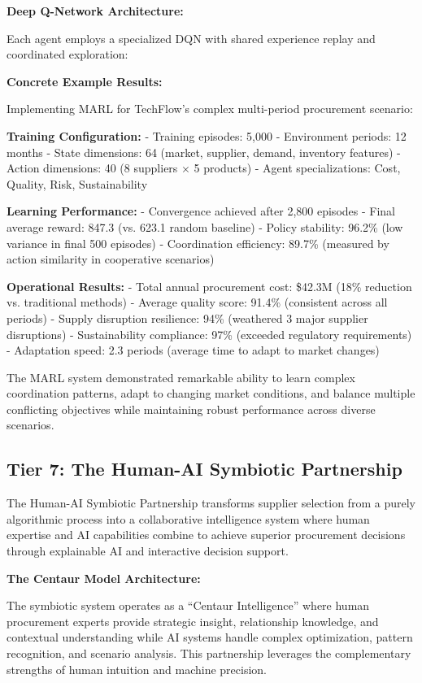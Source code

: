 \documentclass{article}
\begin{document}
\textbf{Deep Q-Network Architecture:}

Each agent employs a specialized DQN with shared experience replay and coordinated exploration:



\textbf{Concrete Example Results:}

Implementing MARL for TechFlow's complex multi-period procurement scenario:

\textbf{Training Configuration:}
- Training episodes: 5,000
- Environment periods: 12 months
- State dimensions: 64 (market, supplier, demand, inventory features)  
- Action dimensions: 40 (8 suppliers $\times$ 5 products)
- Agent specializations: Cost, Quality, Risk, Sustainability

\textbf{Learning Performance:}
- Convergence achieved after 2,800 episodes
- Final average reward: 847.3 (vs. 623.1 random baseline)  
- Policy stability: 96.2\% (low variance in final 500 episodes)
- Coordination efficiency: 89.7\% (measured by action similarity in cooperative scenarios)

\textbf{Operational Results:}
- Total annual procurement cost: \$42.3M (18\% reduction vs. traditional methods)
- Average quality score: 91.4\% (consistent across all periods)
- Supply disruption resilience: 94\% (weathered 3 major supplier disruptions)
- Sustainability compliance: 97\% (exceeded regulatory requirements)
- Adaptation speed: 2.3 periods (average time to adapt to market changes)

The MARL system demonstrated remarkable ability to learn complex coordination patterns, adapt to changing market conditions, and balance multiple conflicting objectives while maintaining robust performance across diverse scenarios.

\subsection{Tier 7: The Human-AI Symbiotic Partnership}

The Human-AI Symbiotic Partnership transforms supplier selection from a purely algorithmic process into a collaborative intelligence system where human expertise and AI capabilities combine to achieve superior procurement decisions through explainable AI and interactive decision support.

\textbf{The Centaur Model Architecture:}

The symbiotic system operates as a ``Centaur Intelligence'' where human procurement experts provide strategic insight, relationship knowledge, and contextual understanding while AI systems handle complex optimization, pattern recognition, and scenario analysis. This partnership leverages the complementary strengths of human intuition and machine precision.
\end{document}
